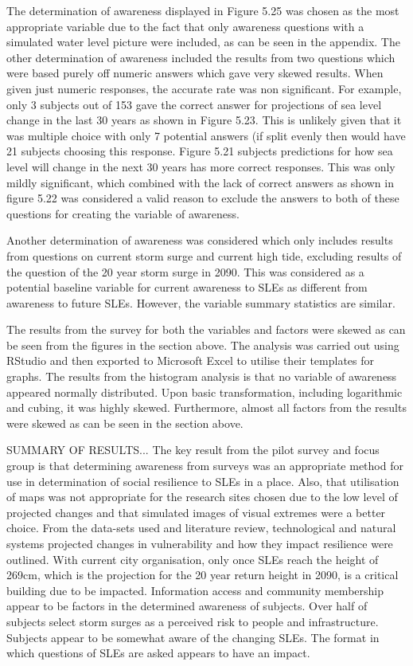 The determination of awareness displayed in Figure 5.25 was chosen as the most appropriate variable due to the fact that only awareness questions with a simulated water level picture were included, as can be seen in the appendix. The other determination of awareness included the results from two questions which were based purely off numeric answers which gave very skewed results. When given just numeric responses, the accurate rate was non significant. For example, only 3 subjects out of 153 gave the correct answer for projections of sea level change in the last 30 years as shown in Figure 5.23.  This is unlikely given that it was multiple choice with only 7 potential answers (if split evenly then would have 21 subjects choosing this response. Figure 5.21 subjects predictions for how sea level will change in the next 30 years has more correct responses. This was only mildly significant, which combined with the lack of correct answers as shown in figure 5.22 was considered a valid reason to exclude the answers to both of these questions for creating the variable of awareness. 


Another determination of awareness was considered which only includes results from questions on current storm surge and current high tide, excluding results of the question of the 20 year storm surge in 2090. This was considered as a potential baseline variable for current awareness to SLEs as different from awareness to future SLEs. However, the variable summary statistics are similar.



The results from the survey for both the variables and factors were skewed as can be seen from the figures in the section above. The analysis was carried out using RStudio and then exported to Microsoft Excel to utilise their templates for graphs. The results from the histogram analysis is that no variable of awareness appeared normally distributed. Upon basic transformation, including logarithmic and cubing, it was highly skewed. Furthermore, almost all factors from the results were skewed as can be seen in the section above. 


SUMMARY OF RESULTS...
The key result from the pilot survey and focus group is that determining awareness from surveys was an appropriate method for use in determination of social resilience to SLEs in a place. Also, that utilisation of maps was not appropriate for the research sites chosen due to the low level of projected changes and that simulated images of visual extremes were a better choice. From the data-sets used and literature review, technological and natural systems projected changes in vulnerability and how they impact resilience were outlined. With current city organisation, only once SLEs reach the height of 269cm, which is the projection for the 20 year return height in 2090, is a critical building due to be impacted. Information access and community membership appear to be factors in the determined awareness of subjects. Over half of subjects select storm surges as a perceived risk to people and infrastructure. Subjects appear to be somewhat aware of the changing SLEs. The format in which questions of SLEs are asked appears to have an impact. 